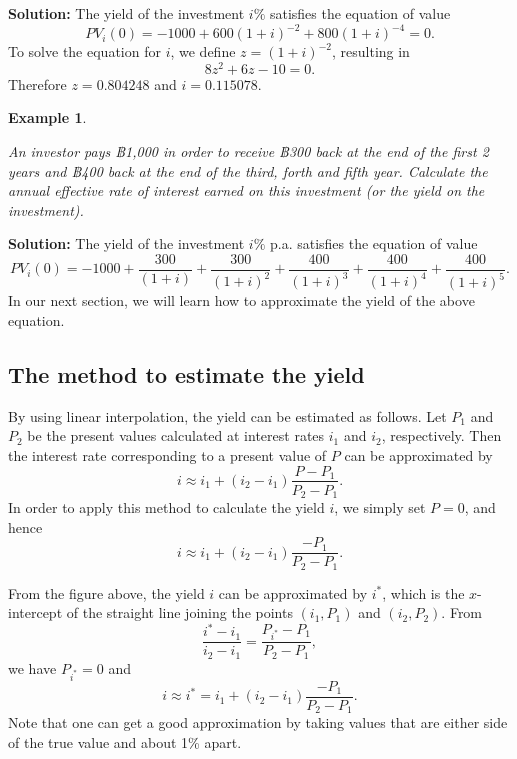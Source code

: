 \documentclass[
]{book}
\theoremstyle{definition}
\theoremstyle{definition}
\newtheorem{example}{Example}[chapter]
\theoremstyle{definition}
\theoremstyle{definition}
\theoremstyle{remark}
\begin{document}
\textbf{Solution:} The yield of the investment \(i\%\) satisfies the equation
of value \[PV_i(0) =  -1000 + 600(1+i)^{-2} + 800(1+i)^{-4} = 0.\] To
solve the equation for \(i\), we define \(z = (1+i)^{-2}\), resulting in
\[8z^2 + 6z - 10 = 0.\] Therefore \(z = 0.804248\) and \(i = 0.115078.\)

\begin{example}
\protect\hypertarget{exm:exampleYield}{}\label{exm:exampleYield}

\emph{An investor pays ฿1,000 in order to receive ฿300 back at the end of the
first 2 years and ฿400 back at the end of the third, forth and fifth
year. Calculate the annual effective rate of interest earned on this
investment (or the yield on the investment).}

\end{example}

\textbf{Solution:} The yield of the investment \(i\%\) p.a. satisfies the
equation of value
\[PV_i(0) =  -1000 + \frac{300}{(1+i)} + \frac{300}{(1+i)^{2}} + \frac{400}{(1+i)^{3}} +  \frac{400}{(1+i)^{4}} + \frac{400}{(1+i)^{5}}.\]
In our next section, we will learn how to approximate the yield of the
above equation.

\hypertarget{the-method-to-estimate-the-yield}{%
\subsection{The method to estimate the yield}\label{the-method-to-estimate-the-yield}}

By using linear interpolation, the yield can be estimated as follows.
Let \(P_1\) and \(P_2\) be the present values calculated at interest rates
\(i_1\) and \(i_2\), respectively. Then the interest rate corresponding to a
present value of \(P\) can be approximated by
\[i \approx i_1 + (i_2 - i_1) \frac{P - P_1}{P_2 - P_1}.\] In order to
apply this method to calculate the yield \(i\), we simply set \(P = 0\), and
hence \[i \approx i_1 + (i_2 - i_1) \frac{ - P_1}{P_2 - P_1}.\]

From the figure above, the yield \(i\) can be approximated by \(i^*\), which
is the \(x\)-intercept of the straight line joining the points \((i_1,P_1)\)
and \((i_2,P_2)\). From
\[\frac{i^* -i_1}{i_2 - i_1} = \frac{P_{i^*} - P_1}{P_2 - P_1},\] we
have \(P_{i^*} = 0\) and
\[i \approx i^* =  i_1 + (i_2 - i_1) \frac{ - P_1}{P_2 - P_1}.\] Note
that one can get a good approximation by taking values that are either
side of the true value and about 1\% apart.
\end{document}
